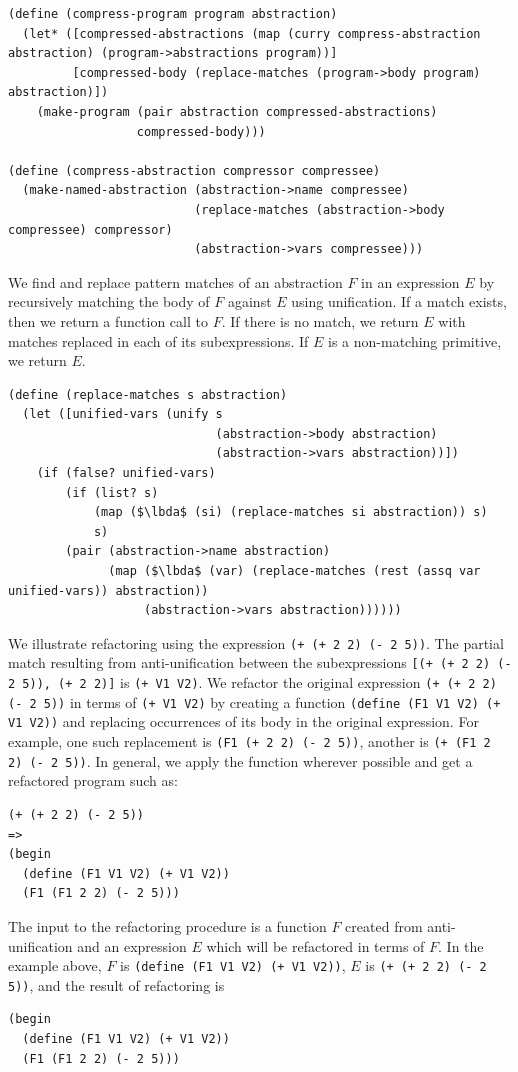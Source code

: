 \documentclass[a4paper,10pt]{article}
\newcommand{\lbda}{\color[rgb]{0,.3,.7} \lambda}
\begin{document}
\begin{lstlisting}[frame=trbl]
(define (compress-program program abstraction)
  (let* ([compressed-abstractions (map (curry compress-abstraction abstraction) (program->abstractions program))]
         [compressed-body (replace-matches (program->body program) abstraction)])
    (make-program (pair abstraction compressed-abstractions)
                  compressed-body)))

(define (compress-abstraction compressor compressee)
  (make-named-abstraction (abstraction->name compressee)
                          (replace-matches (abstraction->body compressee) compressor)
                          (abstraction->vars compressee)))                           
\end{lstlisting}
We find and replace pattern matches of an abstraction $F$ in an expression $E$ by recursively matching the body of $F$ against $E$ using unification. If a match exists, then we return a function call to $F$. If there is no match, we return $E$ with matches replaced in each of its subexpressions. If $E$ is a non-matching primitive, we return $E$.

\begin{lstlisting}[frame=trbl]
(define (replace-matches s abstraction)
  (let ([unified-vars (unify s
                             (abstraction->body abstraction)
                             (abstraction->vars abstraction))])
    (if (false? unified-vars)
        (if (list? s)
            (map ($\lbda$ (si) (replace-matches si abstraction)) s)
            s)
        (pair (abstraction->name abstraction)
              (map ($\lbda$ (var) (replace-matches (rest (assq var unified-vars)) abstraction))
                   (abstraction->vars abstraction))))))
\end{lstlisting}
We illustrate refactoring using the expression \texttt{(+ (+ 2 2) (- 2 5))}. The partial match resulting from anti-unification between the subexpressions \texttt{[(+ (+ 2 2) (- 2 5)), (+ 2 2)]} is \texttt{(+ V1 V2)}.  We refactor the original expression \texttt{(+ (+ 2 2) (- 2 5))} in terms of \texttt{(+ V1 V2)} by creating a function \texttt{(define (F1 V1 V2) (+ V1 V2))} and replacing occurrences of its body in the original expression.  For example, one such replacement is \texttt{(F1 (+ 2 2) (- 2 5))}, another is \texttt{(+ (F1 2 2) (- 2 5))}.  In general, we apply the function wherever possible and get a refactored program such as:
\begin{lstlisting}
(+ (+ 2 2) (- 2 5))
=>
(begin
  (define (F1 V1 V2) (+ V1 V2))
  (F1 (F1 2 2) (- 2 5)))
\end{lstlisting}
The input to the refactoring procedure is a function $F$ created from anti-unification and an expression $E$ which will be refactored in terms of $F$.  In the example above, $F$ is \texttt{(define (F1 V1 V2) (+ V1 V2))}, $E$ is \texttt{(+ (+ 2 2) (- 2 5))}, and the result of refactoring is
\begin{lstlisting}
(begin
  (define (F1 V1 V2) (+ V1 V2))
  (F1 (F1 2 2) (- 2 5)))
\end{lstlisting}
\end{document}
